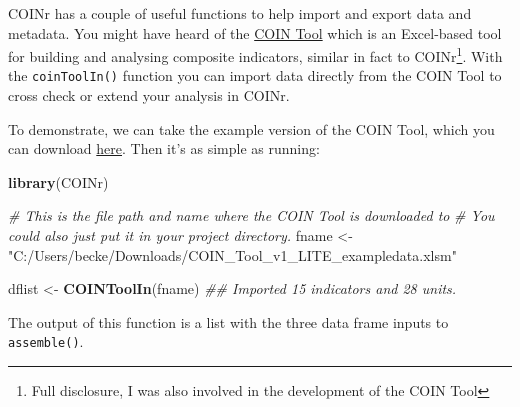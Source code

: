 \documentclass[
]{book}
\newenvironment{Shaded}{\begin{snugshade}}{\end{snugshade}}
\newcommand{\CommentTok}[1]{\textcolor[rgb]{0.56,0.35,0.01}{\textit{#1}}}
\newcommand{\KeywordTok}[1]{\textcolor[rgb]{0.13,0.29,0.53}{\textbf{#1}}}
\newcommand{\NormalTok}[1]{#1}
\newcommand{\StringTok}[1]{\textcolor[rgb]{0.31,0.60,0.02}{#1}}
\begin{document}
COINr has a couple of useful functions to help import and export data and metadata. You might have heard of the \href{https://knowledge4policy.ec.europa.eu/composite-indicators/coin-tool_en}{COIN Tool} which is an Excel-based tool for building and analysing composite indicators, similar in fact to COINr\footnote{Full disclosure, I was also involved in the development of the COIN Tool}. With the \texttt{coinToolIn()} function you can import data directly from the COIN Tool to cross check or extend your analysis in COINr.

To demonstrate, we can take the example version of the COIN Tool, which you can download \href{https://composite-indicators.jrc.ec.europa.eu/sites/default/files/COIN_Tool_v1_LITE_exampledata.xlsm}{here}. Then it's as simple as running:

\begin{Shaded}
\begin{Highlighting}[]
\KeywordTok{library}\NormalTok{(COINr)}

\CommentTok{# This is the file path and name where the COIN Tool is downloaded to}
\CommentTok{# You could also just put it in your project directory.}
\NormalTok{fname <-}\StringTok{ "C:/Users/becke/Downloads/COIN_Tool_v1_LITE_exampledata.xlsm"}

\NormalTok{dflist <-}\StringTok{ }\KeywordTok{COINToolIn}\NormalTok{(fname)}
\CommentTok{## Imported 15 indicators and 28 units.}
\end{Highlighting}
\end{Shaded}

The output of this function is a list with the three data frame inputs to \texttt{assemble()}.
\end{document}
